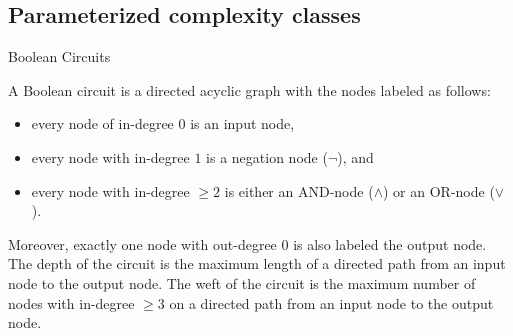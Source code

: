 \subsection{Parameterized complexity classes}

\begin{frame}{Boolean Circuits}
	\begin{definition}
		A \alert{Boolean circuit} is a directed acyclic graph with the nodes labeled as follows:
		\begin{itemize}
			 \item every node of in-degree $0$ is an \alert{input node},
			 \item every node with in-degree $1$ is a \alert{negation node} ($\neg$), and
			 \item every node with in-degree $\ge 2$ is either an \alert{AND-node} ($\wedge$) or an \alert{OR-node} ($\vee$).
		\end{itemize}
		Moreover, exactly one node with out-degree 0 is also labeled the \alert{output node}.\newline
		The \alert{depth} of the circuit is the maximum length of a directed path from an input node to the output node.\newline
		The \alert{weft} of the circuit is the maximum number of nodes with in-degree $\ge 3$ on a directed path from an input node to the output node. 
	\end{definition}
\end{frame}

